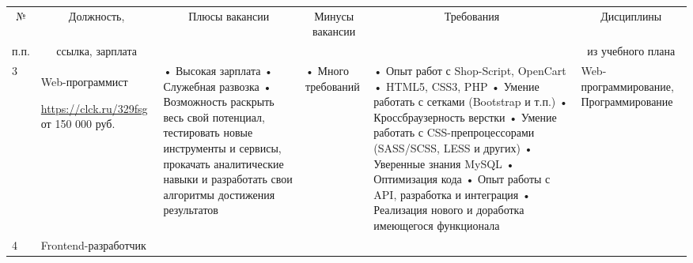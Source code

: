 \begin{landscape}
\begin{table}[H]
\begin{center}
\begin{small}
\begin{tabular}{|p{0.1cm}|p{5cm}|p{4.5cm}|p{4.5cm}|p{4cm}|p{3cm}|}
		\end{tabular}
	\end{small}
	\end{center}
\end{table}




\begin{table}[H]
	\begin{center}
		\begin{small}
		\begin{tabular}{|p{0.1cm}|p{5cm}|p{4.5cm}|p{4.5cm}|p{4cm}|p{3cm}|} \hline
			\multicolumn{1}{|c|}{№}&\multicolumn{1}{c|}{Должность,}&\multicolumn{1}{c|}{Плюсы вакансии}&\multicolumn{1}{c|}{Минусы вакансии}&\multicolumn{1}{c|}{Требования}&\multicolumn{1}{c|}{Дисциплины}\\ 
			\multicolumn{1}{|c|}{п.п.}&\multicolumn{1}{c|}{ссылка, зарплата}&\multicolumn{1}{c|}{}&\multicolumn{1}{c|}{}&\multicolumn{1}{c|}{}&\multicolumn{1}{c|}{из учебного плана}\\ 
			\hline
				3 & Web-программист
				
				\url{https://clck.ru/329fsg}
				от 150 000 руб. &
				• Высокая зарплата
				\newline• Служебная развозка
				\newline• Возможность раскрыть весь свой потенциал, тестировать новые инструменты и сервисы, прокачать аналитические навыки и разработать свои алгоритмы достижения результатов
				&
				• Много требований
				&
				• Опыт работ с Shop-Script, OpenCart
				\newline• HTML5, CSS3, PHP
				\newline• Умение работать с сетками (Bootstrap и т.п.)
				\newline• Кроссбраузерность верстки
				\newline• Умение работать с CSS-препроцессорами (SASS/SCSS, LESS и других)
				\newline• Уверенные знания MySQL
				\newline• Оптимизация кода
				\newline• Опыт работы с API, разработка и интеграция
				\newline• Реализация нового и доработка имеющегося функционала
				&
				Web-программирование, Программирование
				\\ 
                \hline
				4 & Frontend-разработчик
				

\end{tabular}
\end{small}
\end{center}
\end{table}
\end{landscape}
